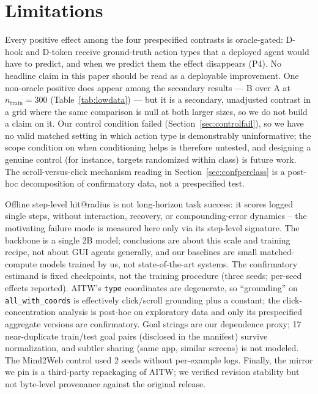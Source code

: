 \section{Limitations}

Every positive effect among the four prespecified contrasts is
oracle-gated: D-hook and D-token receive ground-truth action types that a
deployed agent would have to predict, and when we predict them the effect
disappears (P4). No headline claim in this paper should be read as a
deployable improvement. One non-oracle positive does appear among the
secondary results --- B over A at $n_{\text{train}}{=}300$
(Table~\ref{tab:lowdata}) --- but it is a secondary, unadjusted contrast in
a grid where the same comparison is null at both larger sizes, so we do not
build a claim on it. Our control
condition failed (Section~\ref{sec:controlfail}), so we have no valid
matched setting in which action type is demonstrably uninformative; the
scope condition on when conditioning helps is therefore untested, and
designing a genuine control (for instance, targets randomized within class)
is future work. The scroll-versus-click mechanism reading in
Section~\ref{sec:confperclass} is a post-hoc decomposition of confirmatory
data, not a prespecified test.

Offline step-level hit@radius is not long-horizon task success: it scores
logged single steps, without interaction, recovery, or compounding-error
dynamics -- the motivating failure mode is measured here only via its
step-level signature. The backbone is a single 2B model; conclusions are
about this scale and training recipe, not about GUI agents generally, and
our baselines are small matched-compute models trained by us, not
state-of-the-art systems.
The confirmatory estimand is fixed checkpoints, not the training
procedure (three seeds; per-seed effects reported). AITW's \texttt{type}
coordinates are degenerate, so ``grounding'' on
\texttt{all\_with\_coords} is effectively click/scroll grounding plus a
constant; the click-concentration analysis is post-hoc on exploratory
data and only its prespecified aggregate versions are confirmatory. Goal
strings are our dependence proxy; 17 near-duplicate train/test goal pairs
(disclosed in the manifest) survive normalization, and subtler sharing
(same app, similar screens) is not modeled. The Mind2Web control used 2
seeds without per-example logs. Finally, the mirror we pin is a
third-party repackaging of AITW; we verified revision stability but not
byte-level provenance against the original release.

